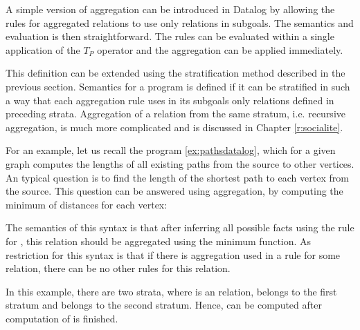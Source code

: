 A simple version of aggregation can be introduced in Datalog by allowing the rules for aggregated relations to use only \edb relations in subgoals. The semantics and evaluation is then straightforward. The rules can be evaluated within a single application of the $T_P$ operator and the aggregation can be applied immediately.

This definition can be extended using the stratification method described in the previous section. Semantics for a program is defined if it can be stratified in such a way that each aggregation rule uses in its subgoals only relations defined in preceding strata. Aggregation of a relation from the same stratum, i.e. recursive aggregation, is much more complicated and is discussed in Chapter \ref{r:socialite}.

For an example, let us recall the program \ref{ex:pathsdatalog}, which for a given graph computes the lengths of all existing paths from the source to other vertices. An typical question is to find the length of the shortest  path to each vertex from the source. This question can be answered using aggregation, by computing the minimum of distances for each vertex: 


The semantics of this syntax is that after inferring all possible facts using the rule for , this relation should be aggregated using the minimum function. As restriction for this syntax is that if there is aggregation used in a rule for some relation, there can be no other rules for this relation.

In this example, there are two strata, where  is an \edb relation,  belongs to the first stratum and  belongs to the second stratum. Hence,  can be computed after computation of  is finished.


